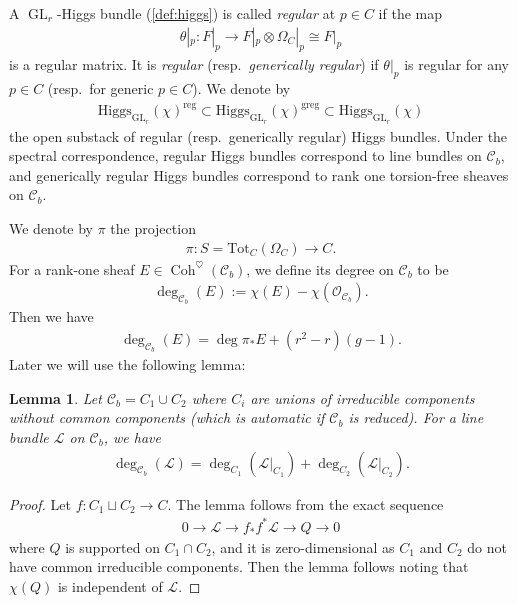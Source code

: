 \documentclass[11pt,oneside,a4paper,mathscr]{amsart}
\newtheorem{lemma}[thm]{Lemma}
\theoremstyle{definition}
\newcommand{\cL}{\mathcal{L}}
\newcommand{\cC}{\mathcal{C}}
\newcommand{\Coh}{\operatorname{Coh}}
\newcommand{\GL}{\operatorname{GL}}
\newcommand{\Hig}{\mathrm{Higgs}}
\begin{document}
A $\GL_r$-Higgs bundle (\ref{def:higgs}) is called \textit{regular} at $p\in C$ if the map 
\begin{align*}\theta|_{p} \colon F|_{p} \to F|_{p} \otimes \Omega_C|_{p} \cong F|_{p}
\end{align*}
is a regular 
matrix. It is \textit{regular} (resp.~\textit{generically regular}) if $\theta|_{p}$ is regular for any 
$p\in C$ (resp.\ for generic $p\in C$). 
We denote by 
\begin{align*}
    \Hig_{\GL_r}(\chi)^{\mathrm{reg}} 
    \subset 
    \Hig_{\GL_r}(\chi)^{\mathrm{greg}} \subset \Hig_{\GL_r}(\chi)
\end{align*}
the open substack of regular (resp.\ generically regular) Higgs bundles. 
Under the spectral correspondence, regular Higgs bundles correspond to 
line bundles on $\cC_b$, and generically regular Higgs bundles 
correspond to rank one torsion-free sheaves on $\cC_b$. 

We denote by $\pi$ the projection 
\begin{align}\label{project:pi}
    \pi \colon S=\mathrm{Tot}_C(\Omega_C) \to C.
\end{align}
For a rank-one sheaf $E\in \Coh^{\heartsuit}(\cC_b)$, we define its degree on $\cC_b$ 
to be 
\begin{align}\label{deg:Cb}
    \deg_{\cC_b}(E):=\chi(E)-\chi(\mathcal{O}_{\cC_b}).
\end{align}
Then we have 
\begin{align}\label{formula:deg}
\deg_{\cC_b}(E)=\deg \pi_{*}E+(r^2-r)(g-1).
\end{align}
Later we will use the following lemma: 
\begin{lemma}\label{lem:add}
Let $\cC_b=C_1 \cup C_2$ where $C_i$ are unions of irreducible components 
without common components (which is automatic if $\cC_b$ is reduced). For a line bundle $\cL$ on $\cC_b$, we have 
\begin{align*}
    \deg_{\cC_b}(\mathcal{L})=\deg_{C_1}(\cL|_{C_1})+\deg_{C_2}(\cL|_{C_2}).
\end{align*}
\end{lemma}
\begin{proof}
    Let $f \colon C_1 \sqcup C_2 \to C$. The lemma follows from 
    the exact sequence 
    \begin{align*}
        0\to \cL \to f_{*}f^* \cL \to Q \to 0
    \end{align*}
    where $Q$ is supported on $C_1 \cap C_2$,
    and it is zero-dimensional as $C_1$ and $C_2$ do not have common 
    irreducible components. Then the lemma follows 
    noting that $\chi(Q)$ is 
    independent of $\cL$. 
\end{proof}
\end{document}
